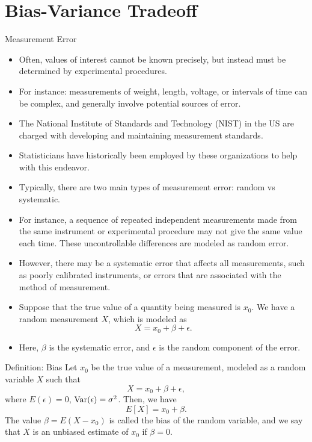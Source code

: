 \section{Bias-Variance Tradeoff}

\begin{frame}[allowframebreaks]{Measurement Error}

\begin{itemize}
  \item Often, values of interest cannot be known precisely, but instead must be determined by experimental procedures.
  \item For instance: measurements of weight, length, voltage, or intervals of time can be complex, and generally involve potential sources of error.
  \item The National Institute of Standards and Technology (NIST) in the US are charged with developing and maintaining measurement standards.
  \item Statisticians have historically been employed by these organizations to help with this endeavor.
  
  \framebreak 
  
  \item Typically, there are two main types of measurement error: \alert{random} vs \alert{systematic}.
  \item For instance, a sequence of repeated independent measurements made from the same instrument or experimental procedure may not give the same value each time. These uncontrollable differences are modeled as \alert{random} error. 
  \item However, there may be a \alert{systematic} error that affects all measurements, such as poorly calibrated instruments, or errors that are associated with the method of measurement.
  \item Suppose that the true value of a quantity being measured is $x_0$. We have a random measurement $X$, which is modeled as 
  $$
  X = x_0 + \beta + \epsilon.
  $$
  \item Here, $\beta$ is the systematic error, and $\epsilon$ is the random component of the error.
\end{itemize}
  \framebreak
  
  \begin{block}{Definition: Bias}
    Let $x_0$ be the true value of a measurement, modeled as a random variable $X$ such that
    $$
    X = x_0 + \beta + \epsilon,
    $$
    where $E(\epsilon) = 0$, $\mathrm{Var}(\epsilon) = \sigma^2$. Then, we have
    $$
    E[X] = x_0 + \beta.
    $$
    The value $\beta = E(X - x_0)$ is called the \alert{bias} of the random variable, and we say that $X$ is an unbiased estimate of $x_0$ if $\beta = 0$. 
  \end{block}
  

\end{frame}
